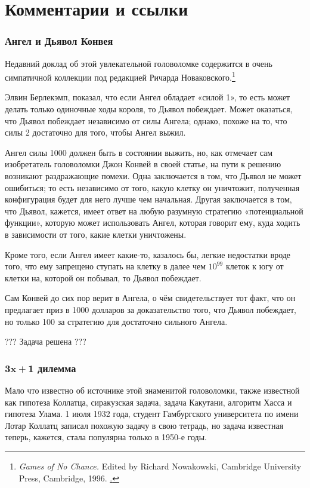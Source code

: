 \section*{Комментарии и ссылки}

\subsubsection*{Ангел и Дьявол Конвея}

Недавний доклад об этой увлекательной головоломке содержится в очень симпатичной коллекции под редакцией Ричарда Новаковского.\footnote{\emph{Games of No Chance.} Edited by Richard Nowakowski, Cambridge University Press, Cambridge, 1996. \href{http://library.msri.org/books/Book29/}.} 

Элвин Берлекэмп,  показал, что если Ангел обладает «силой 1», то есть может делать только одиночные ходы короля, то Дьявол побеждает.
Может оказаться, что Дьявол побеждает независимо от силы Ангела; 
однако, похоже на то, что силы 2 достаточно для того, чтобы Ангел выжил.

Ангел силы 1000 должен быть в состоянии выжить, но, как отмечает сам изобретатель головоломки Джон Конвей в своей статье, на пути к решению возникают раздражающие помехи.
Одна заключается в том, что Дьявол не может ошибиться;
то есть независимо от того, какую клетку он уничтожит, полученная конфигурация будет для него лучше чем начальная.
Другая заключается в том, что Дьявол, кажется, имеет ответ на любую разумную стратегию «потенциальной функции», которую может использовать Ангел, которая говорит ему, куда ходить в зависимости от того, какие клетки уничтожены. %

Кроме того, если Ангел имеет какие-то, казалось бы, легкие недостатки вроде того, что ему запрещено ступать на клетку в далее чем $10^{99}$ клеток к югу от клетки на, которой он побывал, то Дьявол побеждает.

Сам Конвей до сих пор верит в Ангела, о чём свидетельствует тот факт, что он предлагает приз в 1000 долларов за доказательство того, что Дьявол побеждает, но только 100 за стратегию для достаточно сильного Ангела.

??? Задача решена ???

\subsubsection*{$\bm{3x+1}$ дилемма}

Мало что известно об источнике этой знаменитой головоломки, также известной как гипотеза Коллатца, сиракузская задача, задача Какутани, алгоритм Хасса и гипотеза Улама.
1 июля 1932 года, студент Гамбургского университета по имени Лотар Коллатц записал похожую задачу в свою тетрадь, но задача известная теперь, кажется, стала популярна только в 1950-е годы.

